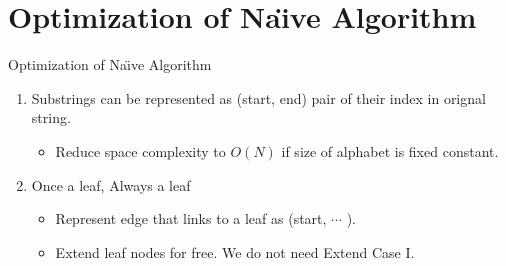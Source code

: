 \section{Optimization of Na\"{\i}ve Algorithm}


\begin{frame}[shrink=5]{Optimization of Na\"{\i}ve Algorithm}
\begin{enumerate}
\item Substrings can be represented as (start, end) pair of their index in orignal string.
\begin{itemize}
\item Reduce space complexity to \alert{$O(N)$} if size of alphabet is fixed constant.
\end{itemize}
\item Once a leaf, Always a leaf
\begin{itemize}
\item Represent edge that links to a leaf as (start, $\cdots$ ).
\item Extend leaf nodes \alert{for free}. We do not need Extend Case I.
\end{itemize}
\end{enumerate}
 

\end{frame}
